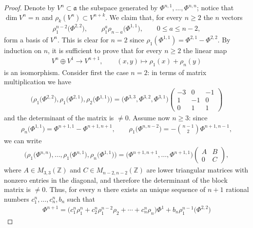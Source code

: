 \documentclass[11pt]{article}
\newcommand{\Z}{\mathbb{Z}}
\numberwithin{equation}{section}
\begin{document}
\begin{proof}Denote by $V^n\subset \mathfrak{a}$ the subspace generated by $\Phi^{n,1},\ldots,\Phi^{n,n}$; notice that $\dim V^n=n$ and
$\rho_k(V^n)\subset V^{n+k}$. We claim that, for every $n\ge 2$ the $n$ vectors
\begin{gather*}\rho_1^{n-2}\big(\Phi^{2,2}\big),\qquad \rho_1^a\rho_{n-a}\big(\Phi^{1,1}\big),\qquad 0\le a\le n-2,\end{gather*}
form a basis of $V^{n}$. This is clear for $n=2$ since $\rho_1(\Phi^{1,1})=\Phi^{2,1}-\Phi^{2,2}$.
By induction on $n$, it is suf\/f\/icient to prove that for every $n\ge 2$ the linear map
\begin{gather*} V^{n}\oplus V^1\to V^{n+1},\qquad (x,y)\mapsto \rho_1(x)+\rho_n(y)\end{gather*}
is an isomorphism. Consider f\/irst the case $n=2$: in terms of matrix multiplication we have
\begin{gather*} \big(\rho_1\big(\Phi^{2,2}\big),\rho_1\big(\Phi^{2,1}\big),\rho_2\big(\Phi^{1,1}\big)\big)=\big(\Phi^{3,3},\Phi^{3,2},\Phi^{3,1}\big)
\begin{pmatrix}-3&0&-1\\
1&-1&0\\
0&1&1\end{pmatrix}\end{gather*}
and the determinant of the matrix is $\not=0$. Assume now $n\ge 3$: since
\begin{gather*} \rho_n\big(\Phi^{1,1}\big)=\Phi^{n+1,1}-\Phi^{n+1,n+1}
,\qquad\rho_1\big(\Phi^{n,n-2}\big)=-\binom{n-1}{2}\Phi^{n+1,n-1},\end{gather*}
we can write
\begin{gather*} \big(\rho_1\big(\Phi^{n,n}\big),\ldots,\rho_1\big(\Phi^{n,1}\big),\rho_n\big(\Phi^{1,1}\big)\big)=
\big(\Phi^{n+1,n+1},\ldots,\Phi^{n+1,1}\big)
\begin{pmatrix}A&B\\
0&C\end{pmatrix},\end{gather*}
where $A\in M_{3,3}(\Z)$ and $C\in M_{n-2,n-2}(\Z)$ are lower triangular matrices with nonzero entries in the diagonal, and therefore the determinant of the block matrix is $\not=0$. Thus, for every $n$ there exists an unique sequence of $n+1$ rational numbers $c^n_1,\ldots,c^n_n,b_n$ such that
\begin{gather*}\Phi^{n+1}=\big(c^n_1\rho_1^n+c^n_2\rho_1^{n-2}\rho_2+\cdots+c^n_n\rho_n\big)\Phi^1+
b_n\rho_1^{n-1}\big(\Phi^{2,2}\big)\end{gather*}

\end{proof}
\end{document}
